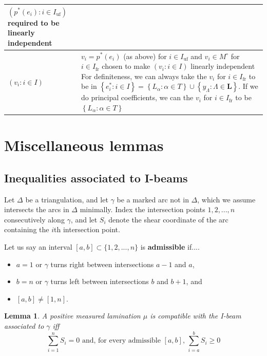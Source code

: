 \documentclass{amsart}
\newtheorem{lemma}[proposition]{Lemma}
\theoremstyle{definition}
\theoremstyle{remark}
\numberwithin{equation}{section}
\newcommand{\uf}{{\operatorname{uf}}}
\newcommand{\fr}{{\operatorname{fr}}}
\newcommand{\set}[1]{{\left\lbrace #1 \right\rbrace}}
\newcommand{\0}{{\mathbf{0}}}
\renewcommand{\L}{\mathbf{L}}
\begin{document}
\begin{longtable}{P{88.5pt}|P{248pt}}
$(p^*(e_i):i\in I_\uf)$ required to be linearly independent\\\hline
$(v_i:i\in I)$&$v_i=p^*(e_i)$ (as above) for $i\in I_\uf$ and
$v_i\in M^\circ$ for $i\in I_\fr$ chosen to make $(v_i:i\in I)$ linearly independent\newline
For definiteness, we can always take the $v_i$ for $i\in I_\fr$ to be in $\set{e^*_i:i\in I}=\set{L_\alpha:\alpha\in T}\cup\set{y_\Lambda:\Lambda\in\L}$.\newline
If we do principal coefficients, we can the $v_i$ for $i\in I_\fr$ to be $\set{L_\alpha:\alpha\in T}$\\\hline
\end{longtable}

\newpage

\section{Miscellaneous lemmas}

\subsection{Inequalities associated to I-beams}

Let $\Delta$ be a triangulation, and let $\gamma$ be a marked arc not in $\Delta$, which we assume intersects the arcs in $\Delta$ minimally. Index the intersection points $1,2,...,n$ consecutively along $\gamma$, and let $S_i$ denote the shear coordinate of the arc containing the $i$th intersection point.

Let us say an interval $[a,b]\subset \{1,2,...,n\}$ is \textbf{admissible} if....
\begin{itemize}
	\item $a=1$ or $\gamma$ turns right between intersections $a-1$ and $a$, 
	\item $b=n$ or $\gamma$ turns left between intersections $b$ and $b+1$, and
	\item $[a,b]\neq [1,n]$.
\end{itemize}

\begin{lemma}
A positive measured lamination $\mu$ is compatible with the I-beam associated to $\gamma$ iff
\[ \sum_{i=1}^nS_i = 0\text{ and, for every admissible $[a,b]$, }\sum_{i=a}^b S_i \geq 0\]
\end{lemma}
\end{document}
